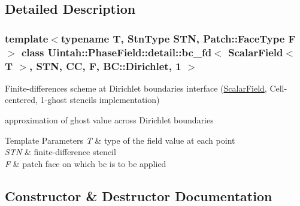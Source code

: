 \subsection{Detailed Description}
\subsubsection*{template$<$typename T, Stn\+Type S\+TN, Patch\+::\+Face\+Type F$>$\newline
class Uintah\+::\+Phase\+Field\+::detail\+::bc\+\_\+fd$<$ Scalar\+Field$<$ T $>$, S\+T\+N, C\+C, F, B\+C\+::\+Dirichlet, 1 $>$}

Finite-\/differences scheme at Dirichlet boundaries interface (\hyperlink{structUintah_1_1PhaseField_1_1ScalarField}{Scalar\+Field}, Cell-\/centered, 1-\/ghost stencils implementation) 

approximation of ghost value across Dirichlet boundaries


\begin{DoxyTemplParams}{Template Parameters}
{\em T} & type of the field value at each point \\
\hline
{\em S\+TN} & finite-\/difference stencil \\
\hline
{\em F} & patch face on which bc is to be applied \\
\hline
\end{DoxyTemplParams}


\subsection{Constructor \& Destructor Documentation}
\mbox{\label{classUintah_1_1PhaseField_1_1detail_1_1bc__fd_3_01ScalarField_3_01T_01_4_00_01STN_00_01CC_00_01Fa77b2fd7fb77d0a4dc6c86c68d4ea0bc_ae9f84f9d7e72f56a8d07e48e72b947d4}} 
